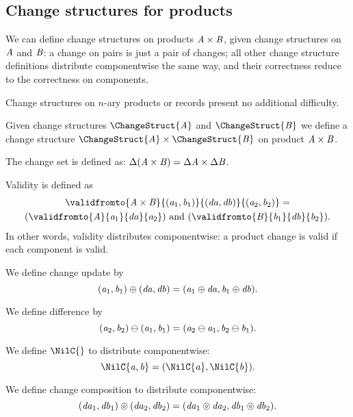\subsection{Change structures for products}
\label{sec:chs-product}

We can define change structures on products \ensuremath{\Conid{A}\times\Conid{B}}, given
change structures on \ensuremath{\Conid{A}} and \ensuremath{\Conid{B}}: a change on pairs is just a
pair of changes; all other change structure definitions
distribute componentwise the same way, and their correctness
reduce to the correctness on components.

Change structures on $n$-ary products or records present no additional
difficulty.

\begin{definition}
  \label{def:chs-prod}
  Given change structures \ensuremath{\ChangeStruct{\Conid{A}}} and \ensuremath{\ChangeStruct{\Conid{B}}} we define a
  change structure \ensuremath{\ChangeStruct{\Conid{A}}\times\ChangeStruct{\Conid{B}}} on product \ensuremath{\Conid{A}\times\Conid{B}}.
  \begin{subdefinition}
  \item The change set is defined as: \ensuremath{\Delta (\Conid{A}\times\Conid{B})\mathrel{=}\Delta \Conid{A}\times\Delta \Conid{B}}.
  \item Validity is defined as
    \begin{multline*}
      \ensuremath{\validfromto{\Conid{A}\times\Conid{B}}{(\Varid{a}_{1},\Varid{b}_{1})}{(\Varid{da},\Varid{db})}{(\Varid{a}_{2},\Varid{b}_{2})}\mathrel{=}} \\
      \ensuremath{(\validfromto{\Conid{A}}{\Varid{a}_{1}}{\Varid{da}}{\Varid{a}_{2}})} \text{ and } \ensuremath{(\validfromto{\Conid{B}}{\Varid{b}_{1}}{\Varid{db}}{\Varid{b}_{2}})}.
    \end{multline*}
    In other words, validity distributes componentwise: a product change
    is valid if each component is valid.
  \item We define change update by
    \[(\mathit{a}_{1},\mathit{b}_{1})\oplus (\mathit{da},\mathit{db})\mathrel{=}(\mathit{a}_{1}\oplus \mathit{da},\mathit{b}_{1}\oplus \mathit{db}).\]
  \item We define difference by
    \[(\mathit{a}_{2},\mathit{b}_{2})\ominus (\mathit{a}_{1},\mathit{b}_{1})\mathrel{=}(\mathit{a}_{2}\ominus \mathit{a}_{1},\mathit{b}_{2}\ominus \mathit{b}_{1}).\]
  \item We define \ensuremath{\NilC{}} to distribute componentwise:
    \[\ensuremath{\NilC{\Varid{a},\Varid{b}}\mathrel{=}(\NilC{\Varid{a}},\NilC{\Varid{b}})}.\]
  \item We define change composition to distribute componentwise:
    \[(\mathit{da}_{1},\mathit{db}_{1})\circledcirc(\mathit{da}_{2},\mathit{db}_{2})\mathrel{=}(\mathit{da}_{1}\circledcirc\mathit{da}_{2},\mathit{db}_{1}\circledcirc\mathit{db}_{2}).\]
  \end{subdefinition}
\end{definition}

